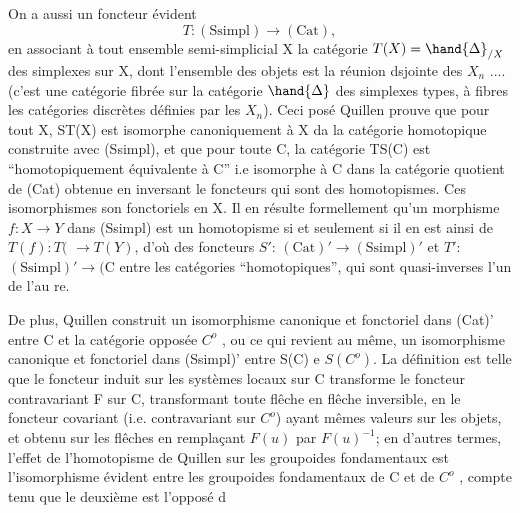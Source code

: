 
On a aussi un foncteur évident
\[ T: (\mathrm{Ssimpl}) \longrightarrow (\mathrm{Cat}) , \]
en associant à tout ensemble semi-simplicial X la catégorie $T(X) = \hand{\Delta}_{/X}$
des simplexes sur X, dont l'ensemble des objets est la réunion dsjointe
des $X_n$ .... (c'est une catégorie fibrée sur la catégorie $\hand{\Delta}$ des simplexes
types, à fibres les catégories discrètes définies par les $X_n$). Ceci posé
Quillen prouve que pour tout X, ST(X) est isomorphe canoniquement à X da
la catégorie homotopique construite avec (Ssimpl), et que pour toute C,
la catégorie TS(C) est  ``homotopiquement équivalente à C''  i.e
 isomorphe à C dans la catégorie quotient de (Cat) obtenue en inversant le
foncteurs qui sont des homotopismes.  Ces isomorphismes son
fonctoriels en X. Il en résulte formellement qu'un morphisme $f:X\rightarrow Y$ dans
(Ssimpl) est un homotopisme si et seulement si il en est ainsi de $T(f):T($
$\rightarrow T(Y)$, d'où des foncteurs $S'$: $(\mathrm{Cat})' \longrightarrow (\mathrm{Ssimpl})'$ et $T'$:$(\mathrm{Ssimpl})' \longrightarrow (\mathrm{C}$
entre les catégories ``homotopiques'',  qui sont quasi-inverses l'un de l'au
re.

De plus, Quillen construit un isomorphisme canonique et fonctoriel
dans (Cat)' entre C et la catégorie opposée $C^{o}$ , ou ce qui revient au
même, un isomorphisme canonique et fonctoriel dans (Ssimpl)' entre S(C) e
$S(C^{o})$.  La définition est telle que le
foncteur induit sur les systèmes locaux sur C transforme le foncteur
contravariant F sur C, transformant toute flêche en flêche inversible, en
le foncteur covariant (i.e. contravariant sur $C^{o}$) ayant mêmes valeurs sur
les objets, et obtenu sur les flêches en remplaçant $F(u)$ par $F(u)^{-1}$; en
d'autres termes, l'effet de l'homotopisme de Quillen sur les groupoides
fondamentaux est l'isomorphisme évident entre les groupoides fondamentaux
de C et de $C^{o}$ , compte tenu que le deuxième est l'opposé d

